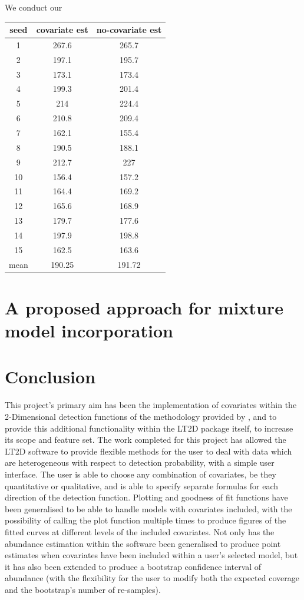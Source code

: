 \documentclass[11pt]{article}
\begin{document}
\begin{multicols}{2}
We conduct our 

\begin{center}
 \begin{tabular}{||c c c||} 
 \hline
 seed & covariate est & no-covariate est  \\ 
 \hline
 1 & 267.6 & 265.7 \\
 \hline
 2 & 197.1 & 195.7  \\
 \hline
 3 & 173.1 & 173.4  \\
 \hline
 4 & 199.3 & 201.4  \\
 \hline
 5 & 214 & 224.4 \\
 \hline
 6 & 210.8 & 209.4 \\
 \hline
 7 & 162.1 & 155.4 \\
 \hline
 8 & 190.5 & 188.1 \\
 \hline
 9 & 212.7 & 227 \\
 \hline
 10 & 156.4 & 157.2 \\
 \hline
 11 & 164.4 & 169.2 \\
 \hline
 12 & 165.6 & 168.9 \\
 \hline
 13 & 179.7 & 177.6 \\
 \hline
 14 & 197.9 & 198.8 \\
 \hline
 15 & 162.5 & 163.6 \\
 \hline
 mean & 190.25 & 191.72 \\
 \hline
\end{tabular}
\end{center}

\section{A proposed approach for mixture model incorporation}
\section{Conclusion}
This project's primary aim has been the implementation of covariates within the 2-Dimensional detection functions of the methodology provided by \cite{Borchers}, and to provide this additional functionality within the LT2D package itself, to increase its scope and feature set. The work completed for this project has allowed the LT2D software  to provide flexible methods for the user to deal with data which are heterogeneous with respect to detection probability, with a simple user interface. The user is able to choose any combination of covariates, be they quantitative or qualitative, and is able to specify separate formulas for each direction of the detection function. Plotting and goodness of fit functions have been generalised to be able to handle models with covariates included, with the possibility of calling the plot function multiple times to produce figures of the fitted curves at different levels of the included covariates. Not only has the abundance estimation within the software been generalised to produce point estimates when covariates have been included within a user's selected model, but it has also been extended to produce a bootstrap confidence interval of abundance (with the flexibility for the user to modify both the expected coverage and the bootstrap's  number of re-samples). 


\end{multicols}
\end{document}
